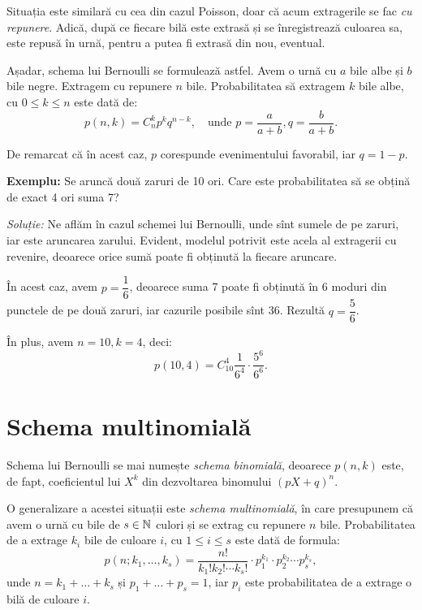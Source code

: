 \indent\indent Situația este similară cu cea din cazul Poisson, doar că acum
extragerile se fac \emph{cu repunere}. Adică, după ce fiecare bilă este extrasă
și se înregistrează culoarea sa, este repusă în urnă, pentru a putea fi extrasă din
nou, eventual.

Așadar, schema lui Bernoulli se formulează astfel. Avem o urnă cu $ a $ bile albe
și $ b $ bile negre. Extragem cu repunere $ n $ bile. Probabilitatea să extragem
$ k $ bile albe, cu $ 0 \leq k \leq n $ este dată de:
\[
  p(n, k) = C_n^k p^k q^{n-k}, \quad \text{unde } p = \frac{a}{a + b}, %
  q = \frac{b}{a + b}.
\]

De remarcat că în acest caz, $ p $ corespunde evenimentului favorabil, iar $ q = 1 - p $.

\vspace{0.3cm}

\textbf{Exemplu:} Se aruncă două zaruri de 10 ori. Care este probabilitatea să se obțină
de exact 4 ori suma 7?

\emph{Soluție:} Ne aflăm în cazul schemei lui Bernoulli, unde  sînt sumele
de pe zaruri, iar  este aruncarea zarului. Evident, modelul potrivit
este acela al extragerii cu revenire, deoarece orice sumă poate fi obținută la fiecare
aruncare.

În acest caz, avem $ p = \dfrac{1}{6} $, deoarece suma 7 poate fi obținută în 6 moduri
din punctele de pe două zaruri, iar cazurile posibile sînt 36. Rezultă $ q = \dfrac{5}{6} $.

În plus, avem $ n = 10, k = 4 $, deci:
\[
  p(10, 4) = C_{10}^4 \frac{1}{6^4} \cdot \frac{5^6}{6^6}.
\]


\section{Schema multinomială}

\indent\indent Schema lui Bernoulli se mai numește \emph{schema binomială},
deoarece $ p(n, k) $ este, de fapt, coeficientul lui $ X^k $ din dezvoltarea
binomului $ (pX + q)^n $.

O generalizare a acestei situații este \emph{schema multinomială}, în care
presupunem că avem o urnă cu bile de $ s \in \mathbb{N} $ culori și se extrag cu
repunere $ n $ bile. Probabilitatea de a extrage $ k_i $ bile de culoare
$ i $, cu $ 1 \leq i \leq s $ este dată de formula:
\[
  p(n; k_1, \dots, k_s) = \frac{n!}{k_1! k_2! \cdots k_s!} \cdot %
  p_1^{k_1} \cdot p_2^{k_2} \cdots p_s^{k_s},
\]
unde $ n = k_1 + \dots + k_s $ și $ p_1 + \dots + p_s = 1 $, iar
$ p_i $ este probabilitatea de a extrage o bilă de culoare $ i $.

